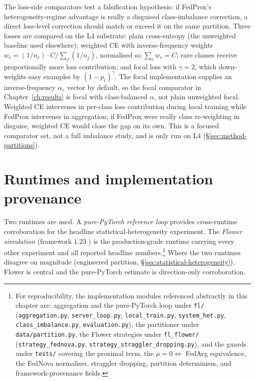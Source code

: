\documentclass[11pt,a4paper]{report}
\begin{document}
The loss-side comparators test a falsification hypothesis: if FedProx's
heterogeneity-regime advantage is really a disguised class-imbalance
correction, a direct loss-level correction should match or exceed it on
the same partition. Three losses are compared on the L4 substrate:
plain cross-entropy
(the unweighted baseline used elsewhere); weighted CE with
inverse-frequency weights $w_c = (1/n_c) \cdot C / \sum_j (1/n_j)$,
normalised so $\sum_c w_c = C$; rare classes receive proportionally
more loss contribution; and focal loss \citep{lin2017focal} with
$\gamma = 2$,
which down-weights easy examples by $(1 - p_t)^{\gamma}$. The focal
implementation supplies an inverse-frequency $\alpha_c$ vector by
default, so the focal comparator in Chapter~\ref{ch:results} is focal
with class-balanced $\alpha$, not plain unweighted focal. Weighted CE
intervenes in per-class loss contribution during local training while
FedProx intervenes in aggregation; if FedProx were really class
re-weighting in disguise, weighted CE would close the gap on its own.
This is a focused comparator set, not a full imbalance study, and is
only run on L4 (§\ref{sec:method-partitions}).

\section{Runtimes and implementation provenance}
\label{sec:method-runtimes}

Two runtimes are used. A \emph{pure-PyTorch reference loop} provides
cross-runtime corroboration for the headline statistical-heterogeneity
experiment. The \emph{Flower simulation} (framework $1.23$
\citep{beutel2020flower}) is the production-grade runtime carrying
every other experiment and all reported headline numbers.\footnote{For
reproducibility, the implementation modules referenced abstractly in
this chapter are: aggregation and the pure-PyTorch loop under
\texttt{fl/} (\texttt{aggregation.py}, \texttt{server\_loop.py},
\texttt{local\_train.py}, \texttt{system\_het.py},
\texttt{class\_imbalance.py}, \texttt{evaluation.py}), the partitioner
under \texttt{data/partition.py}, the Flower strategies under
\texttt{fl\_flower/} (\texttt{strategy\_fednova.py},
\texttt{strategy\_straggler\_dropping.py}), and the guards under
\texttt{tests/} covering the proximal term, the
$\mu = 0 \Leftrightarrow$ FedAvg equivalence, the FedNova normaliser,
straggler dropping, partition determinism, and framework-provenance
fields.} Where the two runtimes disagree on magnitude (engineered
partition, §\ref{sec:statistical-heterogeneity}), Flower is central and
the pure-PyTorch estimate is direction-only corroboration.
\end{document}
